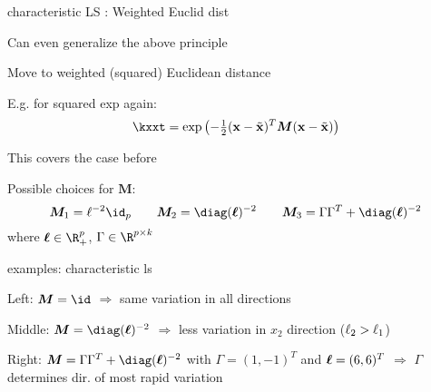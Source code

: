 \documentclass[11pt,compress,t,notes=noshow, xcolor=table]{beamer}
\begin{document}
\begin{framei}[sep=M]{characteristic LS : Weighted Euclid dist}

\item Can even generalize the above principle
\item Move to weighted (squared) Euclidean distance
\item E.g. for squared exp again: 
$$
\kxxt = \exp \left(- \tfrac{1}{2}(\xv - \xtil)^T\bm{M} (\xv - \xtil )\right)
$$
\item This covers the case before
\item Possible choices for $\bm{M}$:
$$
\bm{M}_1 = \ls^{-2}\id_p \qquad \bm{M}_2 = \diag(\bm{\ls})^{-2} \qquad \bm{M}_3 = \Gamma \Gamma^T + \diag(\bm{\ls})^{-2}
$$
where $\bm{\ls} \in \R^p_+$, $\Gamma \in \R^{p \times k}$ 
\end{framei}


\begin{framei}{examples: characteristic ls}



\item Left: $\bm{M} = \id$ $\Rightarrow$ same variation in all directions
\item Middle: $\bm{M} = \diag(\bm{\ls})^{-2}$ $\Rightarrow$ less variation in $x_2$ direction ($\ell_2 > \ell_1$)
\item Right: $\bm{M} = \Gamma \Gamma^T + \diag(\bm{\ls})^{-2}$ with $\Gamma = (1, -1)^T$ and $\bm{\ell} = (6, 6)^T$ $\Rightarrow$ $\Gamma$ determines dir. of most rapid variation
\vfill
{}

\end{framei}

\endlecture
\end{document}
